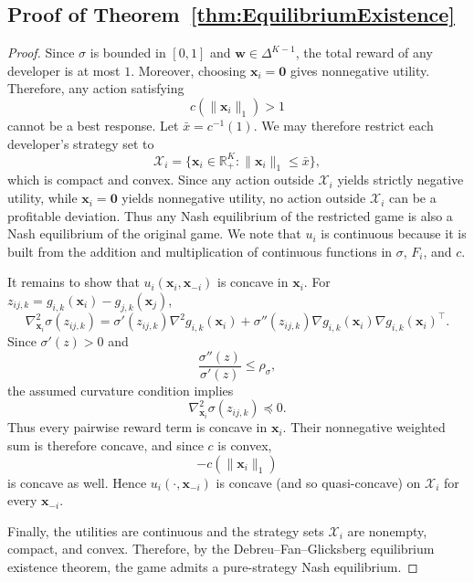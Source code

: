 \subsection{Proof of Theorem~\ref{thm:EquilibriumExistence}}
\label{app:EquilibriumExistence_proof}
\EquilibriumExistence*
\begin{proof}
Since $\sigma$ is bounded in $[0,1]$ and $\mathbf{w}\in\Delta^{K-1}$, the total reward of any developer is at most $1$. Moreover, choosing $\mathbf{x}_i=\mathbf{0}$ gives nonnegative utility. Therefore, any action satisfying
\[
c(\lVert\mathbf{x}_i\rVert_1)>1
\]
cannot be a best response. Let $\bar{x}=c^{-1}(1)$. We may therefore restrict each developer's strategy set to
\[
\mathcal{X}_i=\{\mathbf{x}_i\in\mathbb{R}_+^K:\lVert\mathbf{x}_i\rVert_1\leq\bar{x}\},
\]
which is compact and convex.
Since any action outside \(\mathcal X_i\) yields strictly negative utility, while \(\mathbf x_i=\mathbf0\) yields nonnegative utility, no action outside \(\mathcal X_i\) can be a profitable deviation. Thus any Nash equilibrium of the restricted game is also a Nash equilibrium of the original game.
We note that $u_{i}$ is continuous because it is built from the addition and multiplication of continuous functions in $\sigma$, $F_{i}$, and $c$. 

It remains to show that $u_i(\mathbf{x}_i,\mathbf{x}_{-i})$ is  concave in $\mathbf{x}_i$. For $z_{ij,k}=g_{i,k}(\mathbf{x}_i)-g_{j,k}(\mathbf{x}_j)$,
\[
\nabla_{\mathbf{x}_i}^2 \sigma(z_{ij,k})
=
\sigma'(z_{ij,k})\nabla^2 g_{i,k}(\mathbf{x}_i)
+
\sigma''(z_{ij,k})
\nabla g_{i,k}(\mathbf{x}_i)\nabla g_{i,k}(\mathbf{x}_i)^\top.
\]
Since $\sigma'(z)>0$ and
\[
\frac{\sigma''(z)}{\sigma'(z)} \leq \rho_\sigma,
\]
the assumed curvature condition implies
\[
\nabla_{\mathbf{x}_i}^2 \sigma(z_{ij,k})\preceq 0.
\]
Thus every pairwise reward term is concave in $\mathbf{x}_i$. Their nonnegative weighted sum is therefore concave, and since $c$ is convex,
\[
-c(\lVert\mathbf{x}_i\rVert_1)
\]
is concave as well. Hence $u_i(\cdot,\mathbf{x}_{-i})$ is concave (and so quasi-concave) on $\mathcal{X}_i$ for every $\mathbf{x}_{-i}$.

Finally, the utilities are continuous and the strategy sets $\mathcal{X}_i$ are nonempty, compact, and convex. Therefore, by the Debreu--Fan--Glicksberg equilibrium existence theorem, the game admits a pure-strategy Nash equilibrium.
\end{proof}

